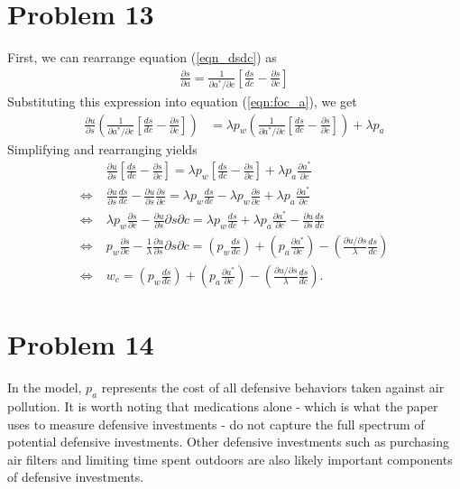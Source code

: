 \documentclass[12pt]{article}
\begin{document}
\section*{Problem 13}
First, we can rearrange equation (\ref{eqn_dsdc}) as
\begin{align*}
	\frac{\partial s}{\partial a} = \frac{1}{\partial a^* / \partial c} \left[ \frac{d s}{d c} - \frac{\partial s}{\partial c} \right]
\end{align*}
Substituting this expression into equation (\ref{eqn:foc_a}), we get
\begin{align*}
	\frac{\partial u}{\partial s} \left( \frac{1}{\partial a^* / \partial c} \left[ \frac{d s}{d c} - \frac{\partial s}{\partial c} \right] \right) &= \lambda p_w \left( \frac{1}{\partial a^* / \partial c} \left[ \frac{d s}{d c} - \frac{\partial s}{\partial c} \right] \right)  + \lambda p_a
\end{align*}
Simplifying and rearranging yields
\begin{align*}
	& \frac{\partial u}{\partial s} \left[ \frac{d s}{d c} - \frac{\partial s}{\partial c} \right] = \lambda p_w \left[ \frac{d s}{d c} - \frac{\partial s}{\partial c} \right] + \lambda p_a \frac{\partial a^*}{\partial c} \\
	\Leftrightarrow \; & \frac{\partial u}{\partial s} \frac{ds}{dc} - \frac{\partial u}{\partial s} \frac{\partial s}{\partial c} = \lambda p_w \frac{ds}{dc} - \lambda p_w \frac{\partial s}{\partial c} + \lambda p_a \frac{\partial a^*}{\partial c} \\
	\Leftrightarrow \; & \lambda p_w \frac{\partial s}{\partial c} - \frac{\partial u}{\partial s}{\partial s}{\partial c} =  \lambda p_w \frac{ds}{dc} + \lambda p_a \frac{\partial a^*}{\partial c} - \frac{\partial u}{\partial s} \frac{ds}{dc} \\
	\Leftrightarrow \; & p_w \frac{\partial s}{\partial c} - \frac{1}{\lambda} \frac{\partial u}{\partial s}{\partial s}{\partial c} =  \left(p_w \frac{ds}{dc} \right) + \left( p_a \frac{\partial a^*}{\partial c} \right) - \left( \frac{\partial u / \partial s}{\lambda} \frac{ds}{dc} \right) \\
	\Leftrightarrow \; & w_c =  \left(p_w \frac{ds}{dc} \right) + \left( p_a \frac{\partial a^*}{\partial c} \right) - \left( \frac{\partial u / \partial s}{\lambda} \frac{ds}{dc} \right).
\end{align*}

\section*{Problem 14}
In the model, $p_a$ represents the cost of all defensive behaviors taken against air pollution. It is worth noting that medications alone - which is what the paper uses to measure defensive investments - do not capture the full spectrum of potential defensive investments. Other defensive investments such as purchasing air filters and limiting time spent outdoors are also likely important components of defensive investments.
\end{document}
